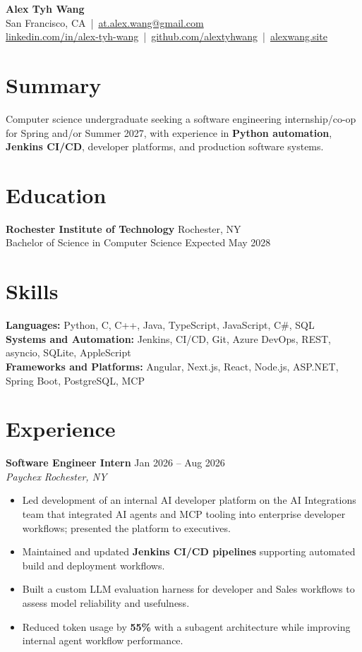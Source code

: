\documentclass[10pt,letterpaper]{article}
\newif\ifresumeFirstRole
\newcommand{\resumeRole}[4]{%
  \ifresumeFirstRole
    \global\resumeFirstRolefalse
  \else
    \vspace{0pt plus 1fill}%
  \fi
  \textbf{#1} \hfill #2\\
  \textit{#3} \hfill \textit{#4}
}
\begin{document}
\begin{center}
{\Large \textbf{Alex Tyh Wang}}\\
San Francisco, CA \,|\, \href{mailto:at.alex.wang@gmail.com}{at.alex.wang@gmail.com}\\
\small \href{https://www.linkedin.com/in/alex-tyh-wang/}{linkedin.com/in/alex-tyh-wang} \,|\, \href{https://github.com/alextyhwang}{github.com/alextyhwang} \,|\, \href{https://alexwang.site}{alexwang.site}
\end{center}

\section*{Summary}
Computer science undergraduate seeking a software engineering internship/co-op for Spring and/or Summer 2027, with experience in \textbf{Python automation}, \textbf{Jenkins CI/CD}, developer platforms, and production software systems.

\section*{Education}
\textbf{Rochester Institute of Technology} \hfill Rochester, NY\\
Bachelor of Science in Computer Science \hfill Expected May 2028

\section*{Skills}
\textbf{Languages:} Python, C, C++, Java, TypeScript, JavaScript, C\#, SQL\\
\textbf{Systems and Automation:} Jenkins, CI/CD, Git, Azure DevOps, REST, asyncio, SQLite, AppleScript\\
\textbf{Frameworks and Platforms:} Angular, Next.js, React, Node.js, ASP.NET, Spring Boot, PostgreSQL, MCP

\section*{Experience}
\resumeRole{Software Engineer Intern}{Jan 2026 -- Aug 2026}{Paychex}{Rochester, NY}
\begin{itemize}
  \item Led development of an internal AI developer platform on the AI Integrations team that integrated AI agents and MCP tooling into enterprise developer workflows; presented the platform to executives.
  \item Maintained and updated \textbf{Jenkins CI/CD pipelines} supporting automated build and deployment workflows.
  \item Built a custom LLM evaluation harness for developer and Sales workflows to assess model reliability and usefulness.
  \item Reduced token usage by \textbf{55\%} with a subagent architecture while improving internal agent workflow performance.
\end{itemize}
\end{document}
